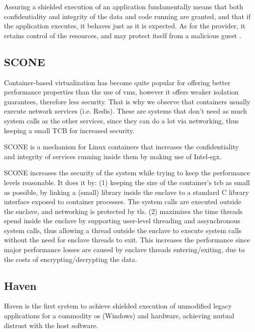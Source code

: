 Assuring a shielded execution of an application fundamentally means that both confidentiality and integrity of the data and code running are granted, and that if the application executes, it behaves just as it is expected. As for the provider, it retains control of the resources, and may protect itself from a malicious guest \cite{havenPaper}. 


\subsection{SCONE}
\label{ssec:scone}

Container-based virtualization has become quite popular for offering better performance properties than the use of \gls{vm}s, however it offers weaker isolation guarantees, therefore less security. 
That is why we observe that containers usually execute network services (i.e. Redis). These are systems that don't need as much system calls as the other services, since they can do a lot via networking, thus keeping a small TCB for increased security.

SCONE \cite{sconePaper} is a mechanism for Linux containers that increases the confidentiality and integrity of services running inside them by making use of Intel-\gls{sgx}.

SCONE increases the security of the system while trying to keep the performance levels reasonable. 
It does it by: 
(1) keeping the size of the container's \gls{tcb} as small as possible, by linking a (small) library inside the enclave to a standard C library interface exposed to container processes. The system calls are executed outside the enclave, and networking is protected by \gls{tls}. 
(2) maximizes the time threads spend inside the enclave by supporting user-level threading and assynchronous system calls, thus allowing a thread outside the enclave to execute system calls without the need for enclave threads to exit.
This increases the performance since major performance losses are caused by enclave threads entering/exiting, due to the costs of encrypting/decrypting the data.



\subsection{Haven}
\label{ssec:haven}

Haven is the first system to achieve shielded execution of unmodified legacy applications for a commodity \gls{os} (Windows) and hardware, achieving mutual distrust with the host software.

